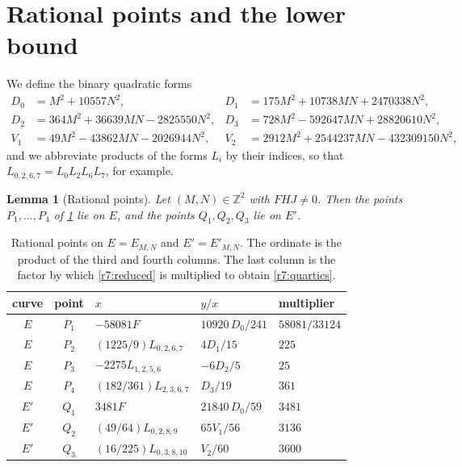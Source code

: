 \documentclass[12pt,oneside,openany]{book}
\theoremstyle{definition}
\theoremstyle{plain}
\numberwithin{equation}{chapter}
\theoremstyle{plain}
\newtheorem{lemma}[lemma]{Lemma}
\theoremstyle{definition}
\theoremstyle{remark}
\newcommand{\Z}{\mathbb Z}
\begin{document}
\section{Rational points and the lower bound}\label{sec:r7-points}

We define the binary quadratic forms
\begin{equation}\label{r7:quadratics}
\begin{aligned}
 D_0&=M^2+10557N^2, & D_1&=175M^2+10738MN+2470338N^2,\\
 D_2&=364M^2+36639MN-2825550N^2, & D_3&=728M^2-592647MN+28820610N^2,\\
 V_1&=49M^2-43862MN-2026944N^2, & V_2&=2912M^2+2544237MN-432309150N^2,
\end{aligned}
\end{equation}
and we abbreviate products of the forms $L_i$ by their indices, so that
$L_{0,2,6,7}=L_0L_2L_6L_7$, for example.

\begin{lemma}[Rational points]\label{lem:r7-points}
Let $(M,N)\in\Z^2$ with $FHJ\ne0$. Then the points $P_1,\dots,P_4$ of
\cref{tab:r7-points} lie on $E$, and the points $Q_1,Q_2,Q_3$ lie on $E'$.
\end{lemma}

\begin{table}[htbp]
\centering
\caption{Rational points on $E=E_{M,N}$ and $E'=E'_{M,N}$. The ordinate is
the product of the third and fourth columns. The last column is the factor
by which \eqref{r7:reduced} is multiplied to obtain \eqref{r7:quartics}.}
\label{tab:r7-points}
\begin{tabular}{cclll}
\toprule
curve & point & $x$ & $y/x$ & multiplier\\
\midrule
$E$ & $P_1$ & $-58081F$ & $10920\,D_0/241$ & $58081/33124$\\
$E$ & $P_2$ & $(1225/9)L_{0,2,6,7}$ & $4D_1/15$ & $225$\\
$E$ & $P_3$ & $-2275L_{1,2,5,6}$ & $-6D_2/5$ & $25$\\
$E$ & $P_4$ & $(182/361)L_{2,3,6,7}$ & $D_3/19$ & $361$\\
\addlinespace
$E'$ & $Q_1$ & $3481F$ & $21840\,D_0/59$ & $3481$\\
$E'$ & $Q_2$ & $(49/64)L_{0,2,8,9}$ & $65V_1/56$ & $3136$\\
$E'$ & $Q_3$ & $(16/225)L_{0,3,8,10}$ & $V_2/60$ & $3600$\\
\bottomrule
\end{tabular}
\end{table}
\end{document}

